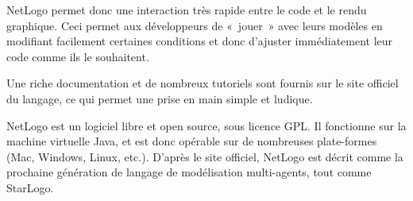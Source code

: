 NetLogo permet donc une interaction très rapide entre le code et le rendu graphique. Ceci permet aux développeurs de «~jouer~» avec leurs modèles en modifiant facilement certaines conditions et donc d'ajuster immédiatement leur code comme ils le souhaitent.

Une riche documentation et de nombreux tutoriels sont fournis sur le site officiel du langage, ce qui permet une prise en main simple et ludique.

NetLogo est un logiciel libre et open source, sous licence GPL. Il fonctionne sur la machine virtuelle Java, et est donc opérable sur de nombreuses plate-formes (Mac, Windows, Linux, etc.).
D'après le site officiel, NetLogo est décrit comme la prochaine génération de langage de modélisation multi-agents, tout comme StarLogo.
